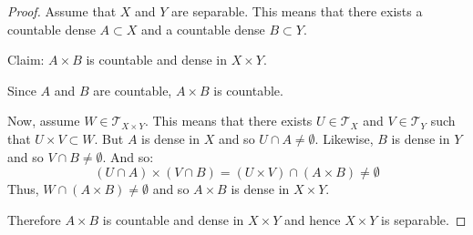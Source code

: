 \documentclass[letterpaper,12pt,fleqn]{article}
\newcommand{\T}{\mathscr{T}}
\begin{document}
\begin{proof}
  Assume that \(X\) and \(Y\) are separable.  This means that there exists a countable dense \(A\subset X\) and a
  countable dense \(B\subset Y\).

  Claim: \(A\times B\) is countable and dense in \(X\times Y\).

  Since \(A\) and \(B\) are countable, \(A\times B\) is countable.

  Now, assume \(W\in\T_{X\times Y}\).  This means that there exists \(U\in\T_X\) and \(V\in\T_Y\) such that
  \(U\times V\subset W\).  But \(A\) is dense in \(X\) and so \(U\cap A\ne\emptyset\).  Likewise, \(B\) is dense in
  \(Y\) and so \(V\cap B\ne\emptyset\).  And so:
  \[(U\cap A)\times(V\cap B)=(U\times V)\cap(A\times B)\ne\emptyset\]
  Thus, \(W\cap (A\times B)\ne\emptyset\) and so \(A\times B\) is dense in \(X\times Y\).

  Therefore \(A\times B\) is countable and dense in \(X\times Y\) and hence \(X\times Y\) is separable.
\end{proof}
\end{document}
